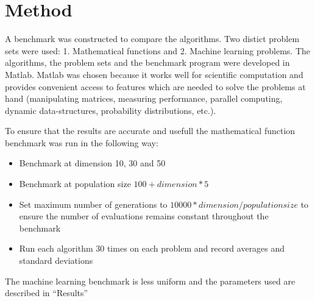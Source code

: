 \section{Method}

A benchmark was constructed to compare the algorithms. Two distict problem sets were used: 1. Mathematical functions and 2. Machine learning problems. The algorithms, the problem sets and the benchmark program were developed in Matlab. Matlab was chosen because it works well for scientific computation and provides convenient access to features which are needed to solve the problems at hand (manipulating matrices, measuring performance, parallel computing, dynamic data-structures, probability distributions, etc.).

To ensure that the results are accurate and usefull the mathematical function benchmark was run in the following way:

\begin{itemize}
  \item Benchmark at dimension 10, 30 and 50
  \item Benchmark at population size $100 + dimension * 5$
  \item Set maximum number of generations to $10000 * dimension / population size$ to ensure the number of evaluations remains constant throughout the benchmark
  \item Run each algorithm 30 times on each problem and record averages and standard deviations
\end{itemize}

The machine learning benchmark is less uniform and the parameters used are described in ``Results''
